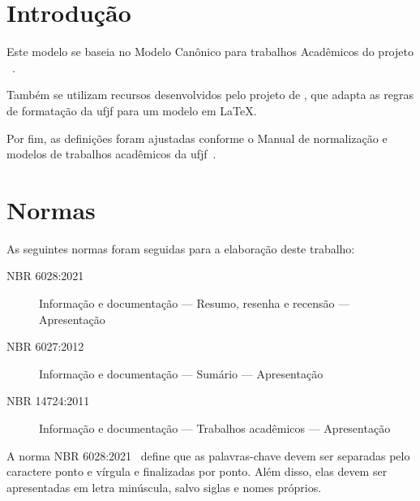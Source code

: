 \section{Introdução}%
\label{sec:introducao}

Este modelo se baseia no Modelo Canônico para trabalhos Acadêmicos do projeto \abnTeX~\cite{abntex2:2024}.

Também se utilizam recursos desenvolvidos pelo projeto de , que adapta as regras de formatação da \gls{ufjf} para um modelo em \LaTeX.

Por fim, as definições foram ajustadas conforme o Manual de normalização e modelos de trabalhos acadêmicos da \gls{ufjf}~\cite{cdd:2023}.

\section{Normas}%
\label{sec:normas}

As seguintes normas foram seguidas para a elaboração deste trabalho:

\begin{description}
    \item[NBR 6028:2021] Informação e documentação --- Resumo, resenha e recensão --- Apresentação~\cite{nbr6028:2021}
    \item[NBR 6027:2012] Informação e documentação --- Sumário --- Apresentação~\cite{nbr6027:2012}
    \item[NBR 14724:2011] Informação e documentação --- Trabalhos acadêmicos --- Apresentação~\cite{nbr14724:2011}
\end{description}

A norma NBR 6028:2021~\cite{nbr6028:2021} define que as palavras-chave devem ser separadas pelo caractere ponto e vírgula e finalizadas por ponto.
Além disso, elas devem ser apresentadas em letra minúscula, salvo siglas e nomes próprios.
